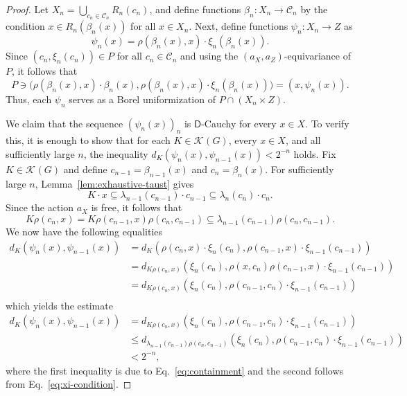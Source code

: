 \documentclass[10pt,a4paper]{amsart}
\newcommand{\unifm}{\mathsf{D}}
\newcommand{\vietoris}[2][]{\mathcal{K}_{#1}(#2)}
\begin{document}
\begin{proof}
  Let \(X_{n} = \bigcup_{c_{n} \in \mathcal{C}_{n}} R_{n}(c_{n})\), and define functions
  \(\beta_{n} : X_{n} \to \mathcal{C}_{n}\) by the condition \(x \in R_{n}(\beta_{n}(x))\) for all
  \(x \in X_{n}\). Next, define functions \(\psi_{n} : X_{n} \to Z\) as
  \begin{equation}
    \label{eq:psi-n-definition}
      \psi_{n}(x) = \rho(\beta_{n}(x), x)\cdot \xi_{n}(\beta_{n}(x)).
  \end{equation}
  Since \((c_{n}, \xi_{n}(c_{n})) \in P\) for all \(c_{n} \in \mathcal{C}_{n}\) and using the
  \((a_{X},a_{Z})\)-equivariance of \(P\), it follows that
  \[
    P \ni \big(\rho(\beta_{n}(x), x)\cdot\beta_{n}(x), \rho(\beta_{n}(x),
    x)\cdot\xi_{n}(\beta_{n}(x))\big) = (x, \psi_{n}(x)).
  \]
  Thus, each \(\psi_{n}\) serves as a Borel uniformization of \(P \cap (X_{n} \times Z)\).

  We claim that the sequence \((\psi_{n}(x))_{n}\) is \(\unifm\)-Cauchy for every \(x \in X\). To
  verify this, it is enough to show that for each \(K \in \vietoris{G}\), every \(x \in X\), and all
  sufficiently large \(n\), the inequality \(d_{K}(\psi_{n}(x), \psi_{n-1}(x)) < 2^{-n}\) holds. Fix
  \(K \in \vietoris{G}\) and define \(c_{n-1} = \beta_{n-1}(x)\) and \(c_{n} = \beta_{n}(x)\). For
  sufficiently large \(n\), Lemma~\ref{lem:exhaustive-taust} gives
  \[
    K\cdot x \subseteq \lambda_{n-1}(c_{n-1})\cdot c_{n-1} \subseteq \lambda_{n}(c_{n})\cdot c_{n}.
  \]
  Since the action \(a_{X}\) is free, it follows that
  \begin{equation}
    \label{eq:containment}
    K\rho(c_{n},x) = K\rho(c_{n-1},x)\rho(c_{n},c_{n-1}) \subseteq
    \lambda_{n-1}(c_{n-1})\rho(c_{n},c_{n-1}).
  \end{equation}
  We now have the following equalities
  \begin{displaymath}
    \begin{aligned}
      d_{K}(\psi_{n}(x), \psi_{n-1}(x))
      &= d_{K}(\rho(c_{n},x)\cdot\xi_{n}(c_{n}), \rho(c_{n-1},x)\cdot\xi_{n-1}(c_{n-1})) \\
      &= d_{K\rho(c_{n}, x)}(\xi_{n}(c_{n}), \rho(x,c_{n})\rho(c_{n-1},x)\cdot\xi_{n-1}(c_{n-1})) \\
      &= d_{K\rho(c_{n}, x)}(\xi_{n}(c_{n}), \rho(c_{n-1},c_{n})\cdot\xi_{n-1}(c_{n-1})) \\
    \end{aligned}
  \end{displaymath}
  which yields the estimate
  \begin{equation}
    \label{eq:psi-n-cauchy}
    \begin{aligned}
      d_{K}(\psi_{n}(x), \psi_{n-1}(x))
      & = d_{K\rho(c_{n}, x)}(\xi_{n}(c_{n}),
        \rho(c_{n-1},c_{n})\cdot\xi_{n-1}(c_{n-1})) \\
      &\le
        d_{\lambda_{n-1}(c_{n-1})\rho(c_{n},c_{n-1})}(\xi_{n}(c_{n}),
        \rho(c_{n-1},c_{n})\cdot\xi_{n-1}(c_{n-1})) \\
      &< 2^{-n},
    \end{aligned}
  \end{equation}
  where the first inequality is due to Eq.~\eqref{eq:containment} and the second follows from
  Eq.~\eqref{eq:xi-condition}.


\end{proof}
\end{document}
